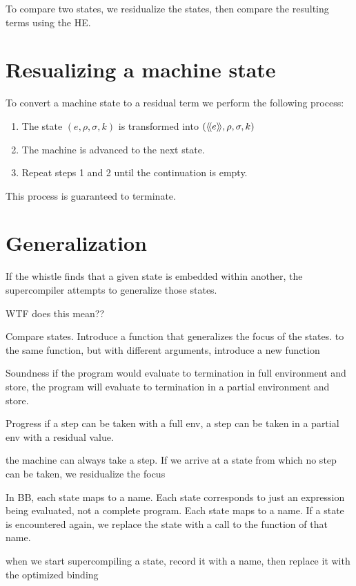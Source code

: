 To compare two states, we residualize the states, then compare the resulting
terms using the HE.

\section{Resualizing a machine state}

To convert a machine state to a residual term
we perform the following process: 
\begin{enumerate}
  \item The state $(e, \rho, \sigma, k)$
    is transformed into $(\langle\!\langle{e}\rangle\!\rangle, \rho, \sigma, k)$
  \item The machine is advanced to the next state.
  \item Repeat steps 1 and 2 until the continuation is empty.
\end{enumerate}

This process is guaranteed to terminate.

\section{Generalization}

If the whistle finds that a given state is embedded within another, the supercompiler attempts to generalize those states.

WTF does this mean??

Compare states. Introduce a function that generalizes the focus
of the states.
to the same function, but with different arguments, introduce
a new function


Soundness
if the program would evaluate to termination in full environment and store,
the program will evaluate to termination in a partial environment and store.

Progress
if a step can be taken with a full env,
a step can be taken in a partial env with a residual value.

the machine can always take a step.
If we arrive at a state from which no step can be taken, 
we residualize the focus 

In BB, each state maps to a name.
Each state corresponds to just an expression being evaluated,
not a complete program.
Each state maps to a name.
If a state is encountered again, we replace the state
with a call to the function of that name.

when we start supercompiling a state, record it with a name,
then replace it with the optimized binding





